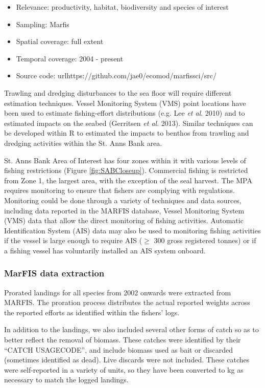 \documentclass[letterpaper,portrait,11pt]{scrartcl}
\numberwithin{equation}{section}		%
\numberwithin{figure}{section}		%
\numberwithin{table}{section}				%
\begin{document}
\begin{itemize}
  \item Relevance:  productivity, habitat, biodiversity and species of interest
  \item Sampling:  Marfis
  \item Spatial coverage: full extent 
  \item Temporal coverage: 2004 - present
  \item Source code: url{https://github.com/jae0/ecomod/marfissci/src/}
\end{itemize}	

Trawling and dredging disturbances to the sea floor will require different estimation techniques.  Vessel Monitoring System (VMS) point locations have been used to estimate fishing-effort distributions (e.g. Lee \textit{et al}. 2010) and to estimated impacts on the seabed (Gerritsen \textit{et al}. 2013).  Similar techniques can be developed within R to estimated the impacts to benthos from trawling and dredging activities within the St. Anns Bank area.   


St. Anns Bank Area of Interest has four zones within it with various levels of fishing restrictions (Figure \ref{fig:SABCloseup}). Commercial fishing is restricted from Zone 1, the largest area, with the exception of the seal harvest.  The MPA requires monitoring to ensure that fishers are complying with regulations.  Monitoring could be done through a variety of techniques and data sources, including data reported in the MARFIS database, Vessel Monitoring System (VMS) data that allow the direct monitoring of fishing activities. Automatic Identification System (AIS) data may also be used to monitoring fishing activities if the vessel is large enough to require AIS ($\geq$ 300 gross registered tonnes) or if a fishing vessel has voluntarily installed an AIS system onboard.  


\subsubsection{MarFIS data extraction}

Prorated landings for all species from 2002 onwards were extracted from MARFIS. The proration process distributes the actual reported weights across the reported efforts as identified within the fishers' logs.  

In addition to the landings, we also included several other forms of catch so as to better reflect the removal of biomass. These catches were identified by their \textquotedblleft CATCH \textunderscore USAGE\textunderscore CODE\textquotedblright, and include biomass used as bait or discarded (sometimes identified as dead).  Live discards were not included.  These catches were self-reported in a variety of units, so they have been converted to kg as necessary to match the logged landings. 
\end{document}

